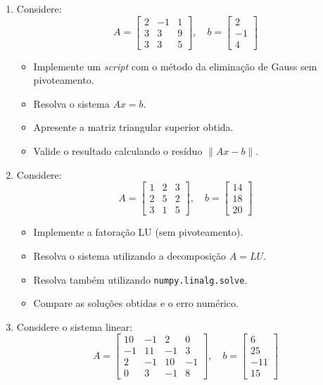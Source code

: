 \begin{enumerate}
\item Considere:
\[
A =
\begin{bmatrix}
2 & -1 & 1 \\
3 & 3 & 9 \\
3 & 3 & 5
\end{bmatrix},
\quad
b =
\begin{bmatrix}
2 \\ -1 \\ 4
\end{bmatrix}
\]

\begin{itemize}
    \item Implemente um \textit{script} com o método da eliminação de Gauss sem pivoteamento.
    \item Resolva o sistema $Ax = b$.
    \item Apresente a matriz triangular superior obtida.
    \item Valide o resultado calculando o resíduo $\|Ax - b\|$.
\end{itemize}

\item Considere:
\[
A =
\begin{bmatrix}
1 & 2 & 3 \\
2 & 5 & 2 \\
3 & 1 & 5
\end{bmatrix},
\quad
b =
\begin{bmatrix}
14 \\ 18 \\ 20
\end{bmatrix}
\]

\begin{itemize}
    \item Implemente a fatoração LU (sem pivoteamento).
    \item Resolva o sistema utilizando a decomposição $A = LU$.
    \item Resolva também utilizando \texttt{numpy.linalg.solve}.
    \item Compare as soluções obtidas e o erro numérico.
\end{itemize}

\item Considere o sistema linear:
\[
A =
\begin{bmatrix}
10 & -1 & 2 & 0 \\
-1 & 11 & -1 & 3 \\
2 & -1 & 10 & -1 \\
0 & 3 & -1 & 8
\end{bmatrix},
\quad
b =
\begin{bmatrix}
6 \\ 25 \\ -11 \\ 15
\end{bmatrix}
\]


\end{enumerate}
